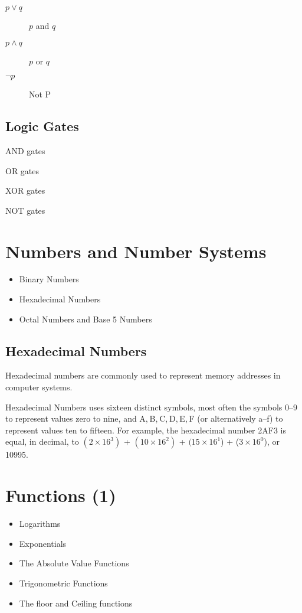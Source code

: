 \documentclass[12pt]{article}
\begin{document}
\begin{description}
\item[$p \vee q$] $p$ and $q$
\item[$p \wedge q$] $p$ or $q$
\item[$\neg p$] Not P
\end{description}


\subsection*{Logic Gates}

\begin{description}
\item AND gates
\item OR gates
\item XOR gates
\item NOT gates
\end{description}
\newpage
\section{Numbers and Number Systems}
\begin{itemize}
\item Binary Numbers
\item Hexadecimal Numbers
\item Octal Numbers and Base 5 Numbers
\end{itemize}

\subsection*{Hexadecimal Numbers}
Hexadecimal numbers are commonly used to represent memory addresses in computer systems.
 
 
Hexadecimal Numbers uses sixteen distinct symbols, most often the symbols 0–9 to represent values zero to nine, and A, B, C, D, E, F (or alternatively a–f) to represent values ten to fifteen. For example, the hexadecimal number 2AF3 is equal, in decimal, to $(2 \times 16^3)$ + $(10 \times 16^2)$ + $(15 \times 16^1$) + ($3 \times 16^0$), or 10995.

\newpage
\section{Functions (1)}
\begin{itemize}
\item Logarithms
\item Exponentials
\item The Absolute Value Functions
\item Trigonometric Functions
\item The floor and Ceiling functions
\end{itemize}
\end{document}
